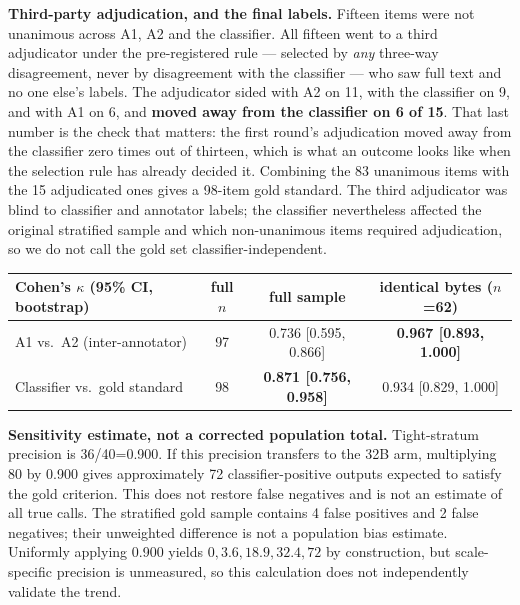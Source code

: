 \textbf{Third-party adjudication, and the final labels.} Fifteen items were not unanimous across
A1, A2 and the classifier. All fifteen went to a third adjudicator under the pre-registered rule
--- selected by \emph{any} three-way disagreement, never by disagreement with the classifier ---
who saw full text and no one else's labels. The adjudicator sided with A2 on 11, with the
classifier on 9, and with A1 on 6, and \textbf{moved away from the classifier on 6 of 15}. That
last number is the check that matters: the first round's adjudication moved away from the
classifier zero times out of thirteen, which is what an outcome looks like when the selection
rule has already decided it. Combining the 83 unanimous items with the 15 adjudicated ones gives
a 98-item gold standard. The third adjudicator was blind to classifier and annotator labels; the
classifier nevertheless affected the original stratified sample and which non-unanimous items
required adjudication, so we do not call the gold set classifier-independent.

\begin{center}
\begin{minipage}{\linewidth}
\centering
\small
{}\label{tab:validation2}
\begin{tabular}{@{}lccc@{}}
\toprule
Cohen's $\kappa$ (95\% CI, bootstrap) & full $n$ & full sample & identical bytes ($n$=62) \\
\midrule
A1 vs.\ A2 (inter-annotator) & 97 & 0.736 [0.595, 0.866] & \textbf{0.967 [0.893, 1.000]} \\
Classifier vs.\ gold standard & 98 & \textbf{0.871 [0.756, 0.958]} & 0.934 [0.829, 1.000] \\
\bottomrule
\end{tabular}
\end{minipage}
\end{center}

\textbf{Sensitivity estimate, not a corrected population total.} Tight-stratum precision is
36/40=0.900. If this precision transfers to the 32B arm, multiplying 80 by 0.900 gives
approximately 72 classifier-positive outputs expected to satisfy the gold criterion. This does
not restore false negatives and is not an estimate of all true calls. The stratified gold sample
contains 4 false positives and 2 false negatives; their unweighted difference is not a population
bias estimate. Uniformly applying 0.900 yields $0,3.6,18.9,32.4,72$ by construction, but
scale-specific precision is unmeasured, so this calculation does not independently validate the trend.


